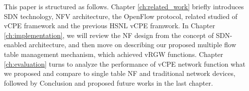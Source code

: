 This paper is structured as follows.
Chapter \ref{ch:related_work} briefly introduces SDN technology, NFV architecture, the OpenFlow protocol, related studied of vCPE framework and the previous HSNL vCPE framwork.
In Chapter \ref{ch:implementation}, we will review the NF design from the concept of SDN-enabled architecture, and then move on describing our proposed multiple flow table management mechanism, which achieved vRGW functions.
Chapter \ref{ch:evaluation} turns to analyze the performance of vCPE network function what we proposed and compare to single table NF and traditional network devices, followed by Conclusion and proposed future works in the last chapter.
